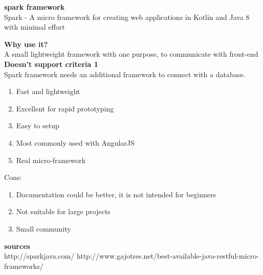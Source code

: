 \textbf{spark framework}\\
Spark - A micro framework for creating web applications in Kotlin and Java 8 with minimal effort

\textbf{Why use it?} \\
A small lightweight framework with one purpose, to communicate with front-end \\

\textbf{Doesn't support criteria 1}\\
Spark framework needs an additional framework  to connect with a database.

\begin{enumerate}
	\item Fast and lightweight
	\item Excellent for rapid prototyping
	\item Easy to setup
	\item Most commonly used with AngularJS
	\item Real micro-framework
\end{enumerate}
Cons:
\begin{enumerate}
	\item Documentation could be better, it is not intended for beginners
	\item Not suitable for large projects
	\item Small community
\end{enumerate}

\textbf{sources}\\
http://sparkjava.com/
http://www.gajotres.net/best-available-java-restful-micro-frameworks/